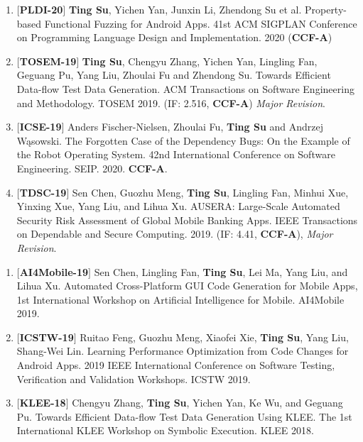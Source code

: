 \documentclass[margin]{res}
\begin{document}
\begin{resume}
\begin{enumerate}[leftmargin=*]
	\item $[$\textbf{PLDI-20}$]$ \textbf{Ting Su}, Yichen Yan, Junxin Li, Zhendong Su et al. Property-based Functional Fuzzing for Android Apps. 41st ACM SIGPLAN Conference on Programming Language Design and Implementation. 2020 (\textbf{CCF-A})
    \item $[$\textbf{TOSEM-19}$]$ \textbf{Ting Su}, Chengyu Zhang, Yichen Yan, Lingling Fan, Geguang Pu, Yang Liu, Zhoulai Fu and Zhendong Su. Towards Efficient Data-flow Test Data Generation. ACM Transactions on Software Engineering and Methodology. TOSEM 2019. (IF: 2.516, \textbf{CCF-A}) \emph{Major Revision}.
    \item $[$\textbf{ICSE-19}$]$ Anders Fischer-Nielsen, Zhoulai Fu, \textbf{Ting Su} and Andrzej Wąsowski. The Forgotten Case of the Dependency Bugs: On the Example of the Robot Operating System. 42nd International Conference on Software Engineering. SEIP. 2020. \textbf{CCF-A}.
    \item $[$\textbf{TDSC-19}$]$ Sen Chen, Guozhu Meng, \textbf{Ting Su}, Lingling Fan, Minhui Xue, Yinxing Xue, Yang Liu, and Lihua Xu. AUSERA: Large-Scale Automated Security Risk Assessment of Global Mobile Banking Apps. IEEE Transactions on Dependable and Secure Computing. 2019. (IF: 4.41, \textbf{CCF-A}), \emph{Major Revision}.
    
\end{enumerate}

\begin{enumerate}[leftmargin=*]
    \item $[$\textbf{AI4Mobile-19}$]$ Sen Chen, Lingling Fan, \textbf{Ting Su}, Lei Ma, Yang Liu, and Lihua Xu. Automated Cross-Platform GUI Code Generation for Mobile Apps, 1st International Workshop on Artificial Intelligence for Mobile. AI4Mobile 2019.
    \item $[$\textbf{ICSTW-19}$]$ Ruitao Feng, Guozhu Meng, Xiaofei Xie, \textbf{Ting Su}, Yang Liu, Shang-Wei Lin. Learning Performance Optimization from Code Changes for Android Apps. 2019 IEEE International Conference on Software Testing, Verification and Validation Workshops. ICSTW 2019.
    \item $[$\textbf{KLEE-18}$]$ Chengyu Zhang, \textbf{Ting Su}, Yichen Yan, Ke Wu, and Geguang Pu. Towards Efficient Data-flow Test Data Generation Using KLEE. The 1st International KLEE Workshop on Symbolic Execution. KLEE 2018.
\end{enumerate}


\end{resume}
\end{document}

